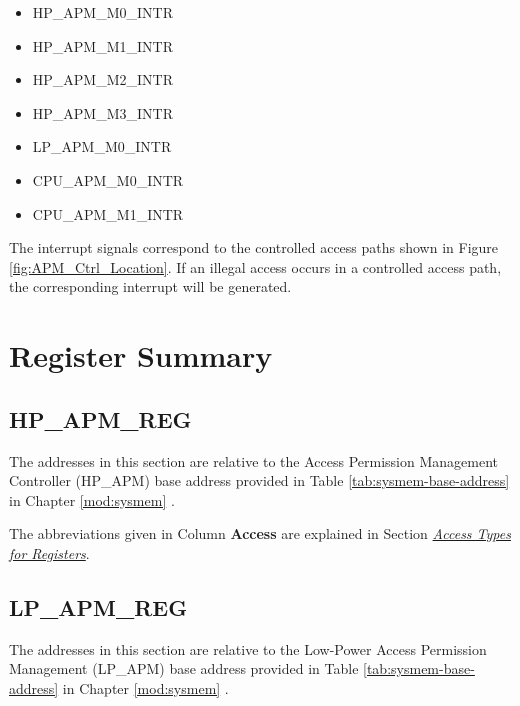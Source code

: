 \documentclass[main\_\_EN.tex]{subfiles}
\begin{document}
\begin{itemize}
    \item HP\_APM\_M0\_INTR
    \item HP\_APM\_M1\_INTR
    \item HP\_APM\_M2\_INTR
    \item HP\_APM\_M3\_INTR
    \item LP\_APM\_M0\_INTR
    \item CPU\_APM\_M0\_INTR
    \item CPU\_APM\_M1\_INTR
\end{itemize}

The interrupt signals correspond to the controlled access paths shown in Figure \ref{fig:APM_Ctrl_Location}. If an illegal access occurs in a controlled access path, the corresponding interrupt will be generated.



\hypertarget{permctrl-reg-summ}{}
\section{Register Summary}
\label{sec:permctrl-reg-summ}


\subsection{HP\_APM\_REG}
\label{sec:permctrl-reg-hp}

The addresses in this section are relative to the Access Permission Management Controller (HP\_APM) base address provided in Table \ref{tab:sysmem-base-address} in Chapter \ref{mod:sysmem} \textit{}.

The abbreviations given in Column \textbf{Access} are explained in Section \hyperref[glossary-access-types]{\textit{Access Types for Registers}}.



\subsection{LP\_APM\_REG}
\label{sec:permctrl-reg-lp}

The addresses in this section are relative to the Low-Power Access Permission Management (LP\_APM) base address provided in Table \ref{tab:sysmem-base-address} in Chapter \ref{mod:sysmem} \textit{}.
\end{document}
